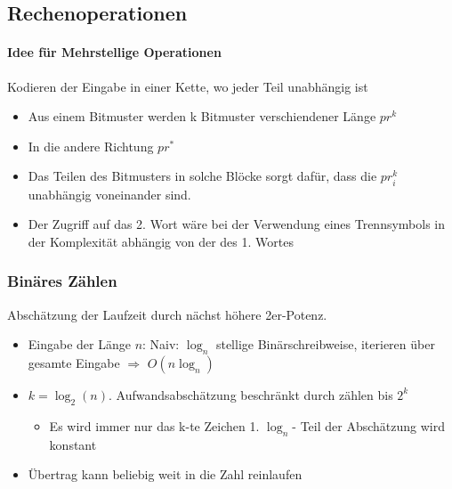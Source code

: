 \documentclass{scrartcl}
\begin{document}

\subsection{Rechenoperationen}
\paragraph{Idee für Mehrstellige Operationen} Kodieren der Eingabe in einer Kette, wo jeder Teil unabhängig ist
\begin{itemize}
\item Aus einem Bitmuster werden k Bitmuster verschiendener Länge $pr^k$ 
\item In die andere Richtung $pr^*$
\item Das Teilen des Bitmusters in solche Blöcke sorgt dafür, dass die $pr_i^k$ unabhängig voneinander sind.
\item Der Zugriff auf das 2. Wort wäre bei der Verwendung eines Trennsymbols in der Komplexität abhängig von der des 1. Wortes
\end{itemize}



\subsubsection{Binäres Zählen}
Abschätzung der Laufzeit durch nächst höhere 2er-Potenz. 
\begin{itemize}
\item Eingabe der Länge $n$: Naiv: $\log_n$ stellige Binärschreibweise, iterieren über gesamte Eingabe $\Rightarrow$ $O(n \log_n)$
\item $k = \log_2(n)$. Aufwandsabschätzung beschränkt durch zählen bis $2^k$
\begin{itemize}
\item Es wird immer nur das k-te Zeichen 1. $\log_n$- Teil der Abschätzung wird konstant
\end{itemize}
\item Übertrag kann beliebig weit in die Zahl reinlaufen
\end{itemize}

\end{document}
